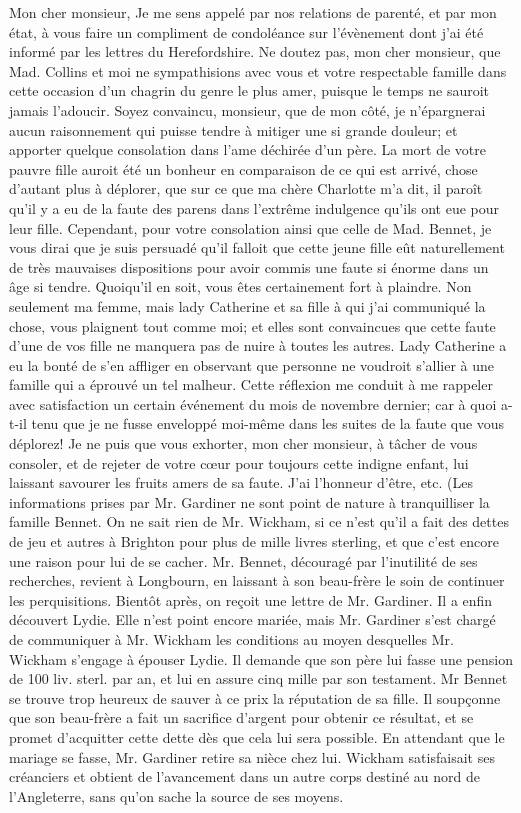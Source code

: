 Mon cher monsieur,
Je me sens appelé par nos relations de parenté, et par mon état, à vous faire un compliment de condoléance sur l'évènement dont j'ai été informé par les lettres du Herefordshire. Ne doutez pas, mon cher monsieur, que Mad. Collins et moi ne sympathisions avec vous et votre respectable famille\setcounter{page}{118} dans cette occasion d'un chagrin du genre le plus amer, puisque le temps ne sauroit jamais l'adoucir. Soyez convaincu, monsieur, que de mon côté, je n'épargnerai aucun raisonnement qui puisse tendre à mitiger une si grande douleur; et apporter quelque consolation dans l'ame déchirée d'un père. La mort de votre pauvre fille auroit été un bonheur en comparaison de ce qui est arrivé, chose d'autant plus à déplorer, que sur ce que ma chère Charlotte m'a dit, il paroît qu'il y a eu de la faute des parens dans l'extrême indulgence qu'ils ont eue pour leur fille. Cependant, pour votre consolation ainsi que celle de Mad. Bennet, je vous dirai que je suis persuadé qu'il falloit que cette jeune fille eût naturellement de très mauvaises dispositions pour avoir commis une faute si énorme dans un âge si tendre. Quoiqu'il en soit, vous êtes certainement fort à plaindre. Non seulement ma femme, mais lady Catherine et sa fille à qui j'ai communiqué la chose, vous plaignent tout comme moi; et elles sont convaincues que cette faute d'une de vos fille ne manquera pas de nuire à toutes les autres. Lady Catherine a eu la bonté de s'en affliger en observant que personne ne voudroit s'allier à une famille qui a éprouvé un tel malheur.\setcounter{page}{119} Cette réflexion me conduit à me rappeler avec satisfaction un certain événement du mois de novembre dernier; car à quoi a-t-il tenu que je ne fusse enveloppé moi-même dans les suites de la faute que vous déplorez! Je ne puis que vous exhorter, mon cher monsieur, à tâcher de vous consoler, et de rejeter de votre cœur pour toujours cette indigne enfant, lui laissant savourer les fruits amers de sa faute. J'ai l'honneur d'être, etc.
(Les informations prises par Mr. Gardiner ne sont point de nature à tranquilliser la famille Bennet. On ne sait rien de Mr. Wickham, si ce n'est qu'il a fait des dettes de jeu et autres à Brighton pour plus de mille livres sterling, et que c'est encore une raison pour lui de se cacher. Mr. Bennet, découragé par l'inutilité de ses recherches, revient à Longbourn, en laissant à son beau-frère le soin de continuer les perquisitions. Bientôt après, on reçoit une lettre de Mr. Gardiner. Il a enfin découvert Lydie. Elle n'est point encore mariée, mais Mr. Gardiner s'est chargé de communiquer à Mr. Wickham les conditions au moyen desquelles Mr. Wickham s'engage à épouser Lydie. Il demande\setcounter{page}{120} que son père lui fasse une pension de 100 liv. sterl. par an, et lui en assure cinq mille par son testament. Mr Bennet se trouve trop heureux de sauver à ce prix la réputation de sa fille. Il soupçonne que son beau-frère a fait un sacrifice d’argent pour obtenir ce résultat, et se promet d’acquitter cette dette dès que cela lui sera possible. En attendant que le mariage se fasse, Mr. Gardiner retire sa nièce chez lui. Wickham satisfaisait ses créanciers et obtient de l’avancement dans un autre corps destiné au nord de l’Angleterre, sans qu’on sache la source de ses moyens.
